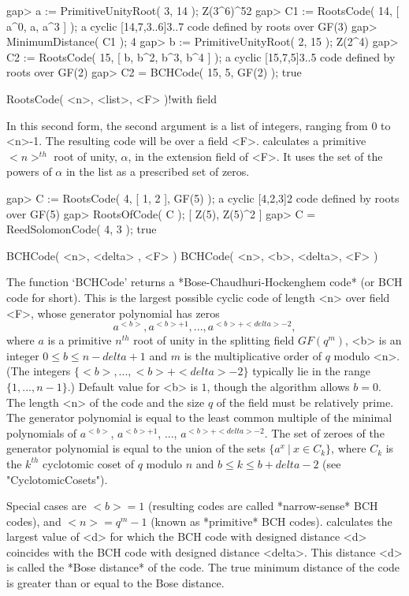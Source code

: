 \beginexample
gap> a := PrimitiveUnityRoot( 3, 14 );
Z(3^6)^52
gap> C1 := RootsCode( 14, [ a^0, a, a^3 ] );
a cyclic [14,7,3..6]3..7 code defined by roots over GF(3)
gap> MinimumDistance( C1 );
4
gap> b := PrimitiveUnityRoot( 2, 15 );
Z(2^4)
gap> C2 := RootsCode( 15, [ b, b^2, b^3, b^4 ] );
a cyclic [15,7,5]3..5 code defined by roots over GF(2)
gap> C2 = BCHCode( 15, 5, GF(2) );
true 
\endexample

\>RootsCode( <n>, <list>, <F> )!{with field}

In this second form,  the second argument is a  list of integers, ranging
from 0  to <n>-1. The  resulting code will  be over a field <F>. {\GUAVA}
calculates  a   primitive $<n>^{th}$   root  of unity,  $\alpha$,  in the
extension field of <F>. It uses the set of  the powers of $\alpha$ in the
list as a prescribed set of zeros.

\beginexample
gap> C := RootsCode( 4, [ 1, 2 ], GF(5) );
a cyclic [4,2,3]2 code defined by roots over GF(5)
gap> RootsOfCode( C );
[ Z(5), Z(5)^2 ]
gap> C = ReedSolomonCode( 4, 3 );
true 
\endexample

\>BCHCode( <n>, <delta> , <F> )
\>BCHCode( <n>, <b>, <delta>, <F> )

The function `BCHCode' returns a *Bose-Chaudhuri-Hockenghem code* (or BCH
code for short).  This is the largest  possible cyclic code of length <n>
over field <F>, whose generator polynomial has zeros 
$$
a^{<b>},a^{<b>+1}, ..., a^{<b>+<delta>-2}, 
$$
where $a$ is a primitive $n^{th}$ root of unity in
the splitting  field $GF(q^m)$, <b> is an integer 
$0\leq b\leq n-delta+1$ and $m$ is the
multiplicative  order of  $q$  modulo  <n>.  
(The integers $\{<b>,...,<b>+<delta>-2\}$
typically lie in the range $\{1,...,n-1\}$.)
Default  value  for  <b> is $1$, though the algorithm
allows $b=0$. The  length <n> of the code and the size $q$ of 
the field must be relatively prime. 
The generator polynomial is equal to the least common multiple of the
minimal polynomials of $a^{<b>}$, $a^{<b>+1}$, ..., $a^{<b>+<delta>-2}$.
The set of zeroes of the generator polynomial is equal to the
union of the sets $\{a^x\ |\ x \in C_k\}$, where
$C_k$ is the $k^{th}$ cyclotomic coset of $q$ modulo $n$
and $b\leq k\leq b+delta-2$ (see "CyclotomicCosets").

Special cases are $<b>=1$ (resulting codes  are called *narrow-sense* BCH
codes), and  $<n>=q^m-1$ (known  as  *primitive*  BCH  codes).   {\GUAVA}
calculates the largest value  of  <d>  for  which  the  BCH  code  with
designed distance  <d>  coincides  with  the  BCH  code  with  designed
distance <delta>. This distance <d> is called the *Bose distance*  of  
the  code.
The true minimum distance of the code is greater than  or  equal  to  the
Bose distance.

